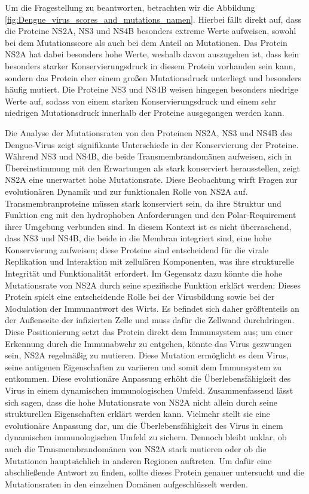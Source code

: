\documentclass[german,version-2022-01]{uzl-thesis}
\begin{document}
Um die Fragestellung zu beantworten, betrachten wir die Abbildung \ref{fig:Dengue_virus_scores_and_mutations_namen}. Hierbei f\"allt direkt auf, dass die Proteine NS2A, NS3 und NS4B besonders extreme Werte aufweisen, sowohl bei dem Mutationsscore als auch bei dem Anteil an Mutationen. Das Protein NS2A hat dabei besonders hohe Werte, weshalb davon auszugehen ist, dass kein besonders starker Konservierungsdruck in diesem Protein vorhanden sein kann, sondern das Protein eher einem gro\ss{}en Mutationsdruck unterliegt und besonders h\"aufig mutiert. Die Proteine NS3 und NS4B weisen hingegen besonders niedrige Werte auf, sodass von einem starken Konservierungsdruck und einem sehr niedrigen Mutationsdruck innerhalb der Proteine ausgegangen werden kann. 

Die Analyse der Mutationsraten von den Proteinen NS2A, NS3 und NS4B des Dengue-Virus zeigt signifikante Unterschiede in der Konservierung der Proteine. W\"ahrend NS3 und NS4B, die beide Transmembrandom\"anen aufweisen, sich in \"Ubereinstimmung mit den Erwartungen als stark konserviert herausstellen, zeigt NS2A eine unerwartet hohe Mutationsrate. Diese Beobachtung wirft Fragen zur evolution\"aren Dynamik und zur funktionalen Rolle von NS2A auf. Transmembranproteine m\"ussen stark konserviert sein, da ihre Struktur und Funktion eng mit den hydrophoben Anforderungen und den Polar-Requirement ihrer Umgebung verbunden sind. In diesem Kontext ist es nicht \"uberraschend, dass NS3 und NS4B, die beide in die Membran integriert sind, eine hohe Konservierung aufweisen; diese Proteine sind entscheidend f\"ur die virale Replikation und Interaktion mit zellul\"aren Komponenten, was ihre strukturelle Integrit\"at und Funktionalit\"at erfordert. Im Gegensatz dazu k\"onnte die hohe Mutationsrate von NS2A durch seine spezifische Funktion erkl\"art werden: Dieses Protein spielt eine entscheidende Rolle bei der Virusbildung sowie bei der Modulation der Immunantwort des Wirts. Es befindet sich daher gr\"o\ss{}tenteils an der Au\ss{}enseite der infizierten Zelle und muss daf\"ur die Zellwand durchdringen. Diese Positionierung setzt das Protein direkt dem Immunsystem aus; um einer Erkennung durch die Immunabwehr zu entgehen, k\"onnte das Virus gezwungen sein, NS2A regelm\"a\ss{}ig zu mutieren. Diese Mutation erm\"oglicht es dem Virus, seine antigenen Eigenschaften zu variieren und somit dem Immunsystem zu entkommen. Diese evolution\"are Anpassung erh\"oht die \"Uberlebensf\"ahigkeit des Virus in einem dynamischen immunologischen Umfeld.
Zusammenfassend l\"asst sich sagen, dass die hohe Mutationsrate von NS2A nicht allein durch seine strukturellen Eigenschaften erkl\"art werden kann. Vielmehr stellt sie eine evolution\"are Anpassung dar, um die \"Uberlebensf\"ahigkeit des Virus in einem dynamischen immunologischen Umfeld zu sichern. Dennoch bleibt unklar, ob auch die Transmembrandom\"anen von NS2A stark mutieren oder ob die Mutationen haupts\"achlich in anderen Regionen auftreten. Um daf\"ur eine abschlie\ss{}ende Antwort zu finden, sollte dieses Protein genauer untersucht und die Mutationsraten in den einzelnen Dom\"anen aufgeschl\"usselt werden. 
\end{document}

